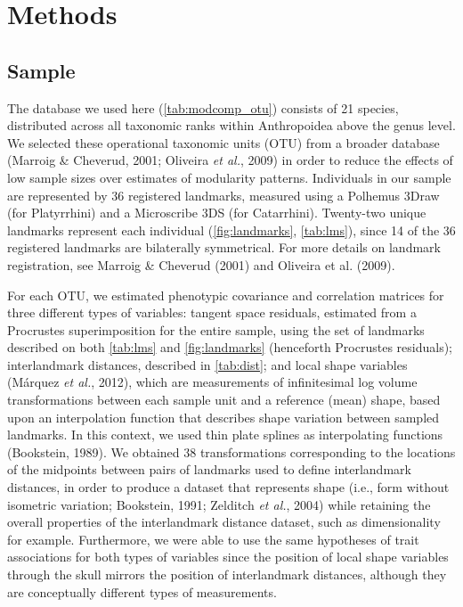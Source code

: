\documentclass[12pt,twoside]{report}
\begin{document}
\section{Methods}\label{methods}

\subsection{Sample}\label{sample}

The database we used here (\autoref{tab:modcomp_otu}) consists of 21
species, distributed across all taxonomic ranks within Anthropoidea
above the genus level. We selected these operational taxonomic units
(OTU) from a broader database (Marroig \& Cheverud, 2001; Oliveira
\emph{et al.}, 2009) in order to reduce the effects of low sample sizes
over estimates of modularity patterns. Individuals in our sample are
represented by 36 registered landmarks, measured using a Polhemus 3Draw
(for Platyrrhini) and a Microscribe 3DS (for Catarrhini). Twenty-two
unique landmarks represent each individual (\autoref{fig:landmarks},
\autoref{tab:lms}), since 14 of the 36 registered landmarks are
bilaterally symmetrical. For more details on landmark registration, see
Marroig \& Cheverud (2001) and Oliveira et al. (2009).



For each OTU, we estimated phenotypic covariance and correlation
matrices for three different types of variables: tangent space
residuals, estimated from a Procrustes superimposition for the entire
sample, using the set of landmarks described on both \autoref{tab:lms}
and \autoref{fig:landmarks} (henceforth Procrustes residuals);
interlandmark distances, described in \autoref{tab:dist}; and local
shape variables (Márquez \emph{et al.}, 2012), which are measurements of
infinitesimal log volume transformations between each sample unit and a
reference (mean) shape, based upon an interpolation function that
describes shape variation between sampled landmarks. In this context, we
used thin plate splines as interpolating functions (Bookstein, 1989). We
obtained 38 transformations corresponding to the locations of the
midpoints between pairs of landmarks used to define interlandmark
distances, in order to produce a dataset that represents shape (i.e.,
form without isometric variation; Bookstein, 1991; Zelditch \emph{et
al.}, 2004) while retaining the overall properties of the interlandmark
distance dataset, such as dimensionality for example. Furthermore, we
were able to use the same hypotheses of trait associations for both
types of variables since the position of local shape variables through
the skull mirrors the position of interlandmark distances, although they
are conceptually different types of measurements.
\end{document}
